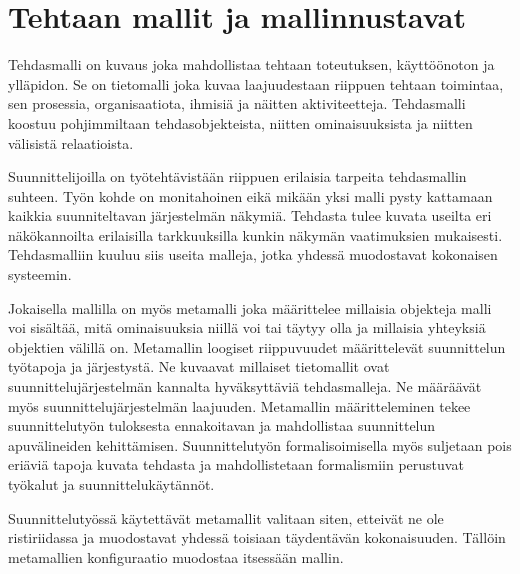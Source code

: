 \documentclass[finnish,12pt]{article}
\begin{document}
	\clearpage
	\section{Tehtaan mallit ja mallinnustavat}

Tehdasmalli on kuvaus joka mahdollistaa tehtaan toteutuksen, käyttöönoton ja ylläpidon. Se on tietomalli joka kuvaa laajuudestaan riippuen tehtaan toimintaa, sen prosessia, organisaatiota, ihmisiä ja näitten aktiviteetteja. Tehdasmalli koostuu pohjimmiltaan tehdasobjekteista, niitten ominaisuuksista ja niitten välisistä relaatioista. \cite{RefWorks:41}

Suunnittelijoilla on työtehtävistään riippuen erilaisia tarpeita tehdasmallin suhteen. Työn kohde on monitahoinen eikä mikään yksi malli pysty kattamaan kaikkia suunniteltavan järjestelmän näkymiä. Tehdasta tulee kuvata useilta eri näkökannoilta erilaisilla tarkkuuksilla kunkin näkymän vaatimuksien mukaisesti. Tehdasmalliin kuuluu siis useita malleja, jotka yhdessä muodostavat kokonaisen systeemin.

Jokaisella mallilla on myös metamalli joka määrittelee millaisia objekteja malli voi sisältää, mitä ominaisuuksia niillä voi tai täytyy olla ja millaisia yhteyksiä objektien välillä on. Metamallin loogiset riippuvuudet määrittelevät suunnittelun työtapoja ja järjestystä. Ne kuvaavat millaiset tietomallit ovat suunnittelujärjestelmän kannalta hyväksyttäviä tehdasmalleja. Ne määräävät myös suunnittelujärjestelmän laajuuden. Metamallin määritteleminen tekee suunnittelutyön tuloksesta ennakoitavan ja mahdollistaa suunnittelun apuvälineiden kehittämisen. Suunnittelutyön formalisoimisella myös suljetaan pois eriäviä tapoja kuvata tehdasta ja mahdollistetaan formalismiin perustuvat työkalut ja suunnittelukäytännöt. 

Suunnittelutyössä käytettävät metamallit valitaan siten, etteivät ne ole ristiriidassa ja muodostavat yhdessä toisiaan täydentävän kokonaisuuden. Tällöin metamallien konfiguraatio muodostaa itsessään mallin.


\end{document}
